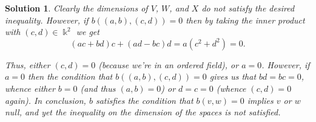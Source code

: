 \documentclass{article}
\theoremstyle{nonumberplain}
\newtheorem{sol}{Solution}
\newcommand{\kk}{\Bbbk}
\begin{document}
\begin{sol}
Clearly the dimensions of $V$, $W$, and $X$ do not satisfy the desired inequality. However, if $b((a,b),(c,d)) = 0$ then by taking the inner product with $(c,d) \in \kk^2$ we get
\begin{equation}
(a c + b d) c + (a d - b c) d  = a (c^2 + d^2) = 0.
\end{equation}

Thus, either $(c,d) = 0$ (because we're in an ordered field), or $a = 0$. However, if $a = 0$ then the condition that $b((a,b),(c,d))=0$ gives us that $bd = bc = 0$, whence either $b = 0$ (and thus $(a,b) = 0$) or $d = c = 0$ (whence $(c,d)=0$ again). In conclusion, $b$ satisfies the condition that $b(v,w) = 0$ implies $v$ or $w$ null, and yet the inequality on the dimension of the spaces is not satisfied.
\end{sol}
\end{document}
